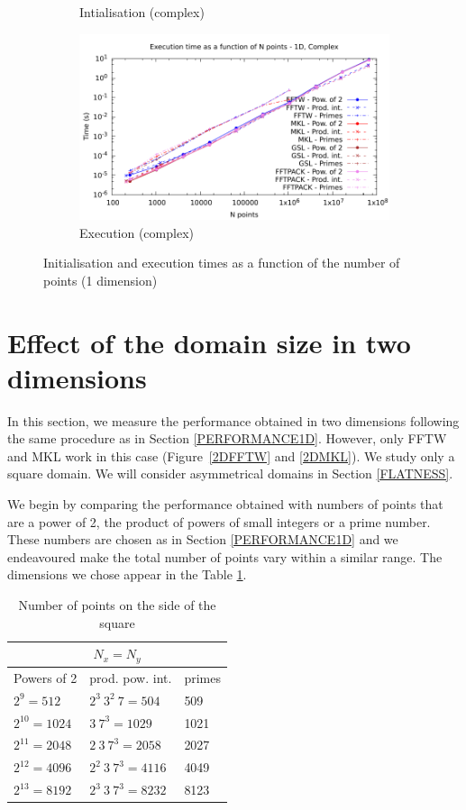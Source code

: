 \documentclass[12pt, a4paper]{article}
\begin{document}
\begin{figure}[H]
\begin{subfigure}{.5\textwidth}
\caption{Intialisation (complex)}
\label{1DCI}
\end{subfigure}%
\begin{subfigure}{.5\textwidth}
\centering
\includegraphics[width=.9\linewidth]{graphs/1d-exec-c.pdf}
\caption{Execution (complex)}
\label{1DC}
\end{subfigure}
\caption{Initialisation and execution times as a function of the number of points (1 dimension)}
\label{1D}
\end{figure}

\section{Effect of the domain size in two dimensions}\label{PERFORMANCE2D}

In this section, we measure the performance obtained in two dimensions following the same procedure as in Section \ref{PERFORMANCE1D}. However, only FFTW and MKL work in this case (Figure~\ref{2DFFTW} and \ref{2DMKL}). We study only a square domain. We will consider asymmetrical domains in Section \ref{FLATNESS}. 

We begin by comparing the performance obtained with numbers of points that are a power of 2, the product of powers of small integers or a prime number. These numbers are chosen as in Section \ref{PERFORMANCE1D} and we endeavoured make the total number of points vary within a similar range. The dimensions we chose appear in the Table \ref{SIZES2D}.

\begin{table}[H]
\captionsetup{width=0.8\linewidth}
\centering
\begin{tabular}{|l|l|l|}
  \hline
  \multicolumn{3}{|c|}{$N_x=N_y$}\\
  \hline
  \hline
Powers of 2 & prod. pow. int. & primes\\ \hline
$2^9=512$ & $2^3\ 3^2\ 7=504$ & 509\\ \hline
$2^{10}=1024$ & $3\ 7^3=1029$ & 1021\\ \hline
$2^{11}=2048$ & $2\ 3\ 7^3=2058$ & 2027\\ \hline
$2^{12}=4096$ & $2^2\ 3\ 7^3=4116$ & 4049\\ \hline
$2^{13}=8192$ & $2^3\ 3\ 7^3=8232$ & 8123\\ \hline
\end{tabular}
\caption{Number of points on the side of the square}\label{SIZES2D}
\end{table}
\end{document}
